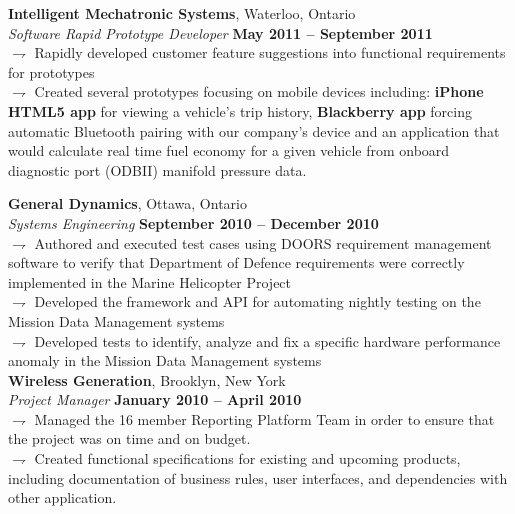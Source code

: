 \documentclass[margin,line]{resume}
\begin{document}
\begin{resume}
    \textbf{Intelligent Mechatronic Systems}, Waterloo, Ontario \vspace{2mm}\\\vspace{1mm}%
    \textsl{Software Rapid Prototype Developer} \hfill \textbf{May 2011 -- September 2011}\\
	$\rightharpoondown$ Rapidly developed customer feature suggestions into functional requirements for prototypes \\
	$\rightharpoondown$ Created several prototypes focusing on mobile devices including: \textbf{iPhone HTML5 app} for viewing a vehicle's trip history, \textbf{Blackberry app} forcing automatic Bluetooth pairing with our company's device and an application that would calculate real time fuel economy for a given vehicle from onboard diagnostic port (ODBII) manifold pressure data.

    \textbf{General Dynamics}, Ottawa, Ontario \vspace{2mm}\\\vspace{1mm}%
    \textsl{Systems Engineering} \hfill \textbf{September 2010 -- December 2010}\\
	$\rightharpoondown$ Authored and executed test cases using DOORS requirement management software to verify that Department of Defence requirements were correctly implemented in the Marine Helicopter Project \\
	$\rightharpoondown$ Developed the framework and API for automating nightly testing on the Mission Data Management systems \\
	$\rightharpoondown$ Developed tests to identify, analyze and fix a specific hardware performance anomaly in the Mission Data Management systems \\


    \textbf{Wireless Generation}, Brooklyn, New York \vspace{2mm}\\\vspace{1mm}%
    \textsl{Project Manager} \hfill \textbf{January 2010 -- April 2010}\\
	$\rightharpoondown$ Managed the 16 member Reporting Platform Team in order to ensure that the project was on time and on budget. \\
	$\rightharpoondown$ Created functional specifications for existing and upcoming products, including documentation of business rules, user interfaces, and dependencies with other application.


\end{resume}
\end{document}
